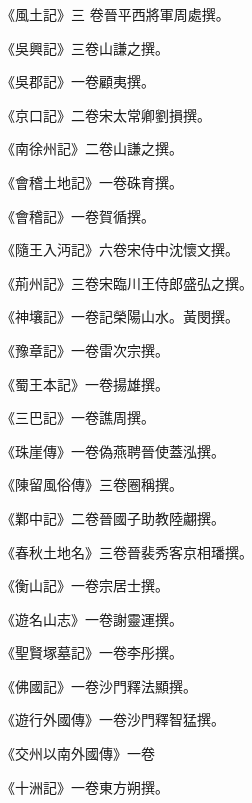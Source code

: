 \begin{pinyinscope}
 《風土記》三
 卷晉平西將軍周處撰。



 《吳興記》三卷山謙之撰。



 《吳郡記》一卷顧夷撰。



 《京口記》二卷宋太常卿劉損撰。



 《南徐州記》二卷山謙之撰。



 《會稽土地記》一卷硃育撰。



 《會稽記》一卷賀循撰。



 《隨王入沔記》六卷宋侍中沈懷文撰。



 《荊州記》三卷宋臨川王侍郎盛弘之撰。



 《神壤記》一卷記榮陽山水。黃閔撰。



 《豫章記》一卷雷次宗撰。



 《蜀王本記》一卷揚雄撰。



 《三巴記》一卷譙周撰。



 《珠崖傳》一卷偽燕聘晉使蓋泓撰。



 《陳留風俗傳》三卷圈稱撰。



 《鄴中記》二卷晉國子助教陸翽撰。



 《春秋土地名》三卷晉裴秀客京相璠撰。



 《衡山記》一卷宗居士撰。



 《遊名山志》一卷謝靈運撰。



 《聖賢塚墓記》一卷李彤撰。



 《佛國記》一卷沙門釋法顯撰。



 《遊行外國傳》一卷沙門釋智猛撰。



 《交州以南外國傳》一卷



 《十洲記》一卷東方朔撰。




\end{pinyinscope}
